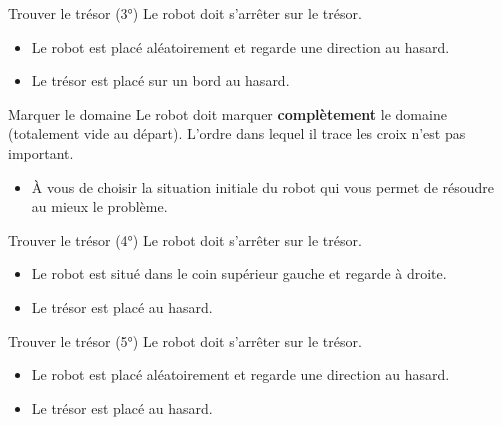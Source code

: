 		\begin{Exercice}{Trouver le trésor (3°)}
			Le robot doit s'arrêter sur le trésor.

			\begin{itemize}
			\item Le robot est placé aléatoirement et regarde une direction au hasard.
			\item Le trésor est placé sur un bord au hasard.
			\end{itemize}
		\end{Exercice}

		\begin{Exercice}{Marquer le domaine}
			Le robot doit marquer \textbf{complètement} le domaine
			(totalement vide au départ). 
			L'ordre dans lequel il trace les croix n'est pas important.

			\begin{itemize}
			\item
				À vous de choisir la situation initiale du robot qui vous permet de
				résoudre au mieux le problème.
			\end{itemize}
		\end{Exercice}

		\begin{Exercice}{Trouver le trésor (4°)}
			Le robot doit s'arrêter sur le trésor.

			\begin{itemize}
			\item Le robot est situé dans le coin supérieur gauche et regarde à droite.
			\item Le trésor est placé au hasard.
			\end{itemize}
		\end{Exercice}

		\begin{Exercice}{Trouver le trésor (5°)}
			Le robot doit s'arrêter sur le trésor.

			\begin{itemize}
			\item Le robot est placé aléatoirement et regarde une direction au hasard.
			\item Le trésor est placé au hasard.
			\end{itemize}
		\end{Exercice}
			
